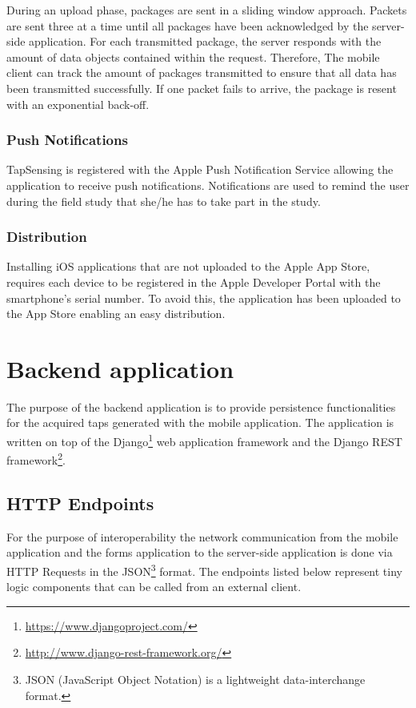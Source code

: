 During an upload phase, packages are sent in a sliding window approach. Packets are sent three at a time until all packages have been acknowledged by the server-side application. For each transmitted package, the server responds with the amount of data objects contained within the request. Therefore, The mobile client can track the amount of packages transmitted to ensure that all data has been transmitted successfully.
If one packet fails to arrive, the package is resent with an exponential back-off.
\subsubsection{Push Notifications}
TapSensing is registered with the Apple Push Notification Service allowing the application to receive push notifications. Notifications are used to remind the user during the field study that she/he has to take part in the study.
\subsubsection{Distribution}
Installing iOS applications that are not uploaded to the Apple App Store, requires each device to be registered in the Apple Developer Portal with the smartphone's serial number. To avoid this, the application has been uploaded to the App Store enabling an easy distribution.

\section{Backend application}
The purpose of the backend application is to provide persistence functionalities for the acquired taps generated with the mobile application. The application is written on top of the Django\footnote{\url{https://www.djangoproject.com/}} web application framework and the Django REST framework\footnote{\url{http://www.django-rest-framework.org/}}.

\label{sec:backend}
\subsection{HTTP Endpoints}
\label{sec:endpoints}
For the purpose of interoperability the network communication from the mobile application and the forms application to the server-side application is done via HTTP Requests in the JSON\footnote{JSON (JavaScript Object Notation)\cite{ietf-jsonbis-rfc7159bis-04} is a lightweight data-interchange format.} format. The endpoints listed below represent tiny logic components that can be called from an external client.

